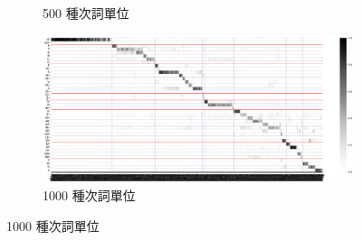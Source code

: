 {{{{\begin{figure}
\begin{subfigure}{\textwidth}
                 \caption{500 種次詞單位}
                 \label{fig:hub-u050-ap0500-givenunit-byphn}
             \end{subfigure}
             \vfill
             \begin{subfigure}{\textwidth}
                 \centering
                 \includegraphics[width=\tempwidth]{feasiblefigs/ch4figs/hub-u050-ap1000-givenunit-byphn.png}
                 \caption{1000 種次詞單位}
                 \label{fig:hub-u050-ap1000-givenunit-byphn}
             \end{subfigure}


\end{figure}}}}}

